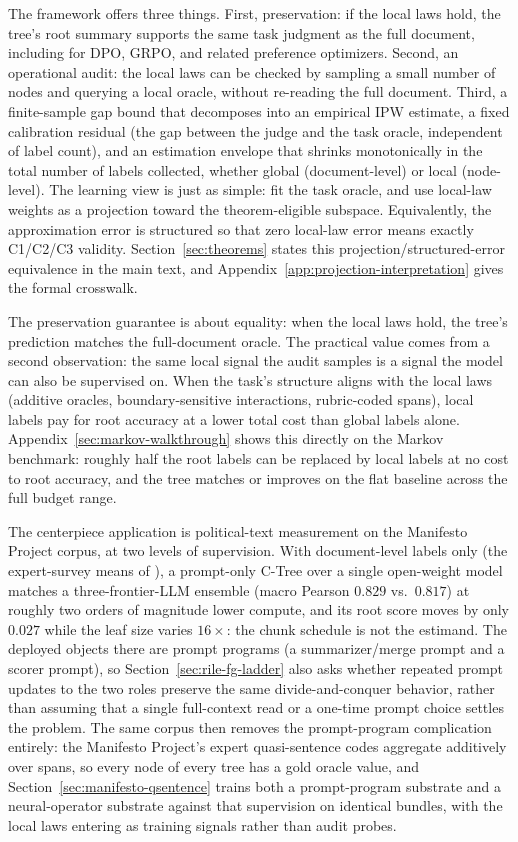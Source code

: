 The framework offers three things. First, preservation: if the local laws hold, the tree's root summary supports the same task judgment as the full document, including for DPO, GRPO, and related preference optimizers. Second, an operational audit: the local laws can be checked by sampling a small number of nodes and querying a local oracle, without re-reading the full document. Third, a finite-sample gap bound that decomposes into an empirical IPW estimate, a fixed calibration residual (the gap between the judge and the task oracle, independent of label count), and an estimation envelope that shrinks monotonically in the total number of labels collected, whether global (document-level) or local (node-level). The learning view is just as simple: fit the task oracle, and use local-law weights as a projection toward the theorem-eligible subspace. Equivalently, the approximation error is structured so that zero local-law error means exactly C1/C2/C3 validity. Section~\ref{sec:theorems} states this projection/structured-error equivalence in the main text, and Appendix~\ref{app:projection-interpretation} gives the formal crosswalk.

The preservation guarantee is about equality: when the local laws hold, the tree's prediction matches the full-document oracle. The practical value comes from a second observation: the same local signal the audit samples is a signal the model can also be supervised on. When the task's structure aligns with the local laws (additive oracles, boundary-sensitive interactions, rubric-coded spans), local labels pay for root accuracy at a lower total cost than global labels alone. Appendix~\ref{sec:markov-walkthrough} shows this directly on the Markov benchmark: roughly half the root labels can be replaced by local labels at no cost to root accuracy, and the tree matches or improves on the flat baseline across the full budget range.

The centerpiece application is political-text measurement on the
Manifesto Project corpus, at two levels of supervision. With
document-level labels only (the expert-survey means of
\citealp{BenoitEtAl2025}), a prompt-only C-Tree over a single
open-weight model matches a three-frontier-LLM ensemble (macro Pearson
$0.829$ vs.\ $0.817$) at roughly two orders of magnitude lower
compute, and its root score moves by only $0.027$ while the leaf size
varies $16\times$: the chunk schedule is not the estimand. The
deployed objects there are prompt programs (a summarizer/merge prompt
and a scorer prompt), so Section~\ref{sec:rile-fg-ladder} also asks
whether repeated prompt updates to the two roles preserve the same
divide-and-conquer behavior, rather than assuming that a single
full-context read or a one-time prompt choice settles the problem.
The same corpus then removes the prompt-program complication entirely:
the Manifesto Project's expert quasi-sentence codes aggregate
additively over spans, so every node of every tree has a gold oracle
value, and Section~\ref{sec:manifesto-qsentence} trains both a
prompt-program substrate and a neural-operator substrate against that
supervision on identical bundles, with the local laws entering as
training signals rather than audit probes.

